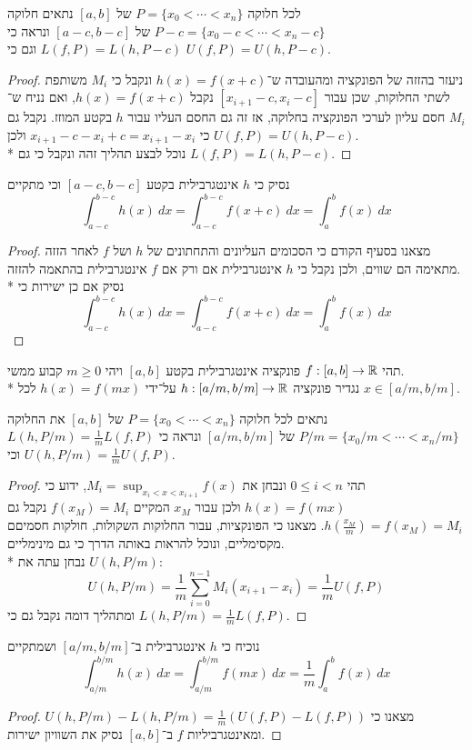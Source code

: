 \Subquestion{}
לכל חלוקה $P = \{ x_0 < \cdots < x_n \}$ של $[a, b]$ נתאים חלוקה $P - c = \{ x_0 - c < \cdots < x_n - c \}$ של $[a - c, b - c]$ ונראה כי $L(f, P) = L(h, P - c)$ וגם כי $U(f, P) = U(h, P - c)$.
\begin{proof}
	ניעזר בהזזה של הפונקציה ומהעובדה ש־$h(x) = f(x + c)$ ונקבל כי $M_i$ משותפת לשתי החלוקות, שכן עבור $[x_{i + 1} - c, x_i - c]$ נקבל $h(x) = f(x + c)$, ואם נניח ש־$M_i$ חסם עליון לערכי הפונקציה בחלוקה,
	אז זה גם החסם העליו עבור $h$ בקטע המוזז. נקבל גם כי $x_{i + 1} - c - x_i + c = x_{i + 1} - x_i$ ולכן $U(f, P) = U(h, P - c)$. \\*
	נוכל לבצע תהליך זהה ונקבל כי גם $L(f, P) = L(h, P - c)$.
\end{proof}

\Subquestion{}
נסיק כי $h$ אינטגרבילית בקטע $[a - c, b - c]$ וכי מתקיים
\[
	\int_{a - c}^{b - c} h(x)\ dx
	= \int_{a - c}^{b - c} f(x + c)\ dx
	= \int_{a}^{b} f(x)\ dx
\]
\begin{proof}
	מצאנו בסעיף הקודם כי הסכומים העליונים והתחתונים של $h$ ושל $f$ לאחר הזזה מתאימה הם שווים, ולכן נקבל כי $h$ אינטגרבילית אם ורק אם $f$ אינטגרבילית בהתאמה להזזה. \\*
	נסיק אם כן ישירות כי
	\[
		\int_{a - c}^{b - c} h(x)\ dx
		= \int_{a - c}^{b - c} f(x + c)\ dx
		= \int_{a}^{b} f(x)\ dx
	\]
\end{proof}

\Question{}
תהי $f : [a, b] \to \mathbb{R}$ פונקציה אינטגרבילית בקטע $[a, b]$ ויהי $m \ge 0$ קבוע ממשי. \\*
נגדיר פונקציה $h : [a/m, b/m] \to \mathbb{R}$ על־ידי $h(x) = f(mx)$ לכל $x \in [a/m, b/m]$.

\Subquestion{}
נתאים לכל חלוקה $P = \{x_0 < \cdots < x_n\}$ של $[a, b]$ את החלוקה $P/m = \{x_0/m < \cdots < x_n/m\}$ של $[a/m, b/m]$ ונראה כי $L(h, P/m) = \frac{1}{m} L(f, P)$ וכי $U(h, P/m) = \frac{1}{m} U(f, P)$.
\begin{proof}
	תהי $0 \le i < n$ ונבחן את $M_i = \sup_{x_i < x < x_{i + 1}} f(x)$, ידוע כי $h(x) = f(mx)$ ולכן עבור $x_M$ המקיים $f(x_M) = M_i$ נקבל גם $h(\frac{x_M}{m}) = f(x_M) = M_i$. 
	מצאנו כי הפונקציות, עבור החלוקות השקולות, חולקות חסמיםם מקסימליים, ונוכל להראות באותה הדרך כי גם מינימליים. \\*
	נבחן עתה את $U(h, P/m)$:
	\[
		U(h, P/m)
		= \frac{1}{m} \sum_{i = 0}^{n - 1} M_i (x_{i + 1} - x_i)
		= \frac{1}{m} U(f, P)
	\]
	ומתהליך דומה נקבל גם כי $L(h, P/m) = \frac{1}{m} L(f, P)$.
\end{proof}

\Subquestion{}
נוכיח כי $h$ אינטגרבילית ב־$[a/m, b/m]$ ושמתקיים
\[
	\int_{a/m}^{b/m} h(x)\ dx
	= \int_{a/m}^{b/m} f(mx)\ dx
	= \frac{1}{m} \int_{a}^{b} f(x)\ dx
\]
\begin{proof}
	מצאנו כי $U(h, P/m) - L(h, P/m) = \frac{1}{m}( U(f, P) - L(f, P))$ ומאינטגרביליות $f$ ב־$[a, b]$ נסיק את השוויון ישירות.
\end{proof}

